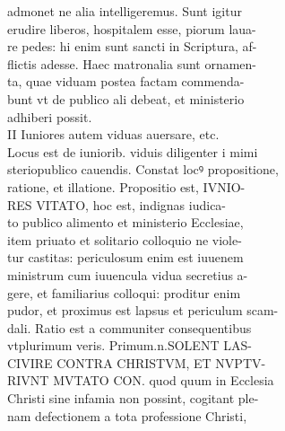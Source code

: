 \documentclass{article}
\begin{document}
\begin{pages}
                admonet ne alia intelligeremus. Sunt igitur \\
                erudire liberos, hospitalem esse, piorum laua- \\
                re pedes: hi enim sunt sancti in Scriptura, af- \\
                flictis adesse. Haec matronalia sunt ornamen- \\
                ta, quae viduam postea factam commenda- \\
                bunt vt de publico ali debeat, et ministerio \\
                adhiberi possit. \\
                II Iuniores autem viduas auersare, etc. \\
                Locus est de iuniorib. viduis diligenter i mimi \\
                steriopublico cauendis. Constat locꝰ propositione, \\
                ratione, et illatione. Propositio est, IVNIO- \\
                RES VITATO, hoc est, indignas iudica- \\
                to publico alimento et ministerio Ecclesiae, \\
                item priuato et solitario colloquio ne viole- \\
                tur castitas: periculosum enim est iuuenem \\
                ministrum cum iuuencula vidua secretius a- \\
                gere, et familiarius colloqui: proditur enim \\
                pudor, et proximus est lapsus et periculum scam- \\
                dali. Ratio est a communiter consequentibus \\
                vtplurimum veris. Primum.n.SOLENT LAS- \\
                CIVIRE CONTRA CHRISTVM, ET NVPTV- \\
                RIVNT MVTATO CON. quod quum in Ecclesia \\
                Christi sine infamia non possint, cogitant ple- \\
                nam defectionem a tota professione Christi, \\

\end{pages}
\end{document}
